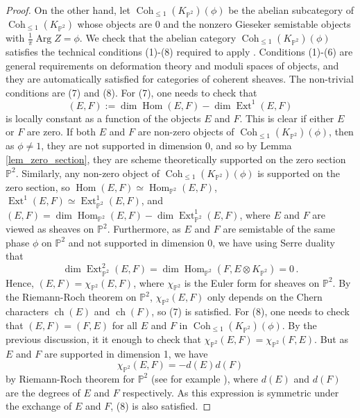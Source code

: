 \documentclass[11pt,letterpaper]{amsart}
\newcommand\PP{\mathbb P}
\newcommand\Arg{\operatorname{Arg}}
\newcommand\Coh{\operatorname{Coh}}
\newcommand\Ext{\operatorname{Ext}}
\newcommand\Hom{\operatorname{Hom}}
\newcommand\ch{\operatorname{ch}}
\begin{document}
\begin{proof}
On the other hand, let $\Coh_{\leqslant 1}(K_{\PP^2})(\phi)$ be the abelian subcategory of
$\Coh_{\leqslant 1}(K_{\PP^2})$ whose objects are $0$ and the nonzero Gieseker semistable objects with $\frac{1}{\pi} \Arg Z=\phi$. We check that the abelian category $\Coh_{\leqslant 1}(K_{\PP^2})(\phi)$ satisfies the technical conditions (1)-(8)
required to apply 
\cite[Theorem 1.1]{meinhardt2015donaldson}. Conditions (1)-(6) are general requirements on deformation theory and moduli spaces of objects, and they are automatically satisfied for categories of coherent sheaves. The non-trivial conditions are (7) and (8). For (7), one needs to check that 
\[ (E,F):=\dim \Hom(E,F)-\dim \Ext^1(E,F)\] 
is locally constant as a function of the objects $E$ and $F$. This is clear if either $E$ or $F$ are zero. If both $E$ and $F$ are non-zero objects of $\Coh_{\leqslant 1}(K_{\PP^2})(\phi)$, then as $\phi \neq 1$, they are not supported in dimension $0$, and so by Lemma \ref{lem_zero_section}, they are scheme theoretically supported on the zero section $\PP^2$. Similarly, any non-zero object of $\Coh_{\leqslant 1}(K_{\PP^2})(\phi)$ is supported on the zero section, so $\Hom(E,F)\simeq \Hom_{\PP^2}(E,F)$, $\Ext^1(E,F) \simeq \Ext^1_{\PP^2}(E,F)$, and 
$(E,F)=\dim \Hom_{\PP^2}(E,F)-\dim \Ext^1_{\PP^2}(E,F)$, where $E$ and $F$ are viewed as sheaves on $\PP^2$. Furthermore, as $E$ and $F$ are semistable of the same phase $\phi$ on $\PP^2$ and not supported in dimension $0$, we have using Serre duality that \[ \dim \Ext^2_{\PP^2}(E,F)=\dim \Hom_{\PP^2}(F, E \otimes K_{\PP^2})=0\,.\] 
Hence, $(E,F)=\chi_{\PP^2}(E,F)$, where $\chi_{\PP^2}$ is the Euler form for sheaves on $\PP^2$. By the Riemann-Roch theorem on $\PP^2$, $\chi_{\PP^2}(E,F)$ only depends on the Chern characters $\ch(E)$ and $\ch(F)$, so (7) is satisfied.
For (8), one needs to check that $(E,F)=(F,E)$ for all $E$ and $F$ in $\Coh_{\leqslant 1}(K_{\PP^2})(\phi)$. By the previous discussion, it it enough to check that $\chi_{\PP^2}(E,F)=\chi_{\PP^2}(F,E)$. But as $E$ and $F$ are supported in dimension 1, we have 
\[ \chi_{\PP^2}(E,F)=-d(E)d(F)\] by Riemann-Roch theorem for 
$\PP^2$ (see for example \cite[Lemma 2.1.2]{bousseau2019scattering}), where $d(E)$ and $d(F)$ are the degrees of $E$ and $F$ respectively. As this expression is symmetric under the exchange of $E$ and $F$, (8) is also satisfied.



\end{proof}
\end{document}
